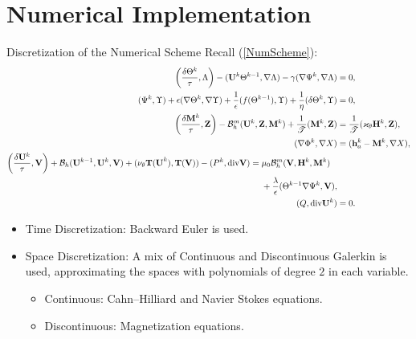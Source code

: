 \documentclass[9pt]{beamer}
\newcommand{\grad}{\nabla}
\newcommand{\diverg}{\textup{div} }
\newcommand{\eps}{\epsilon}
\begin{document}
\section{Numerical Implementation}
\begin{frame}{Discretization of the Numerical Scheme}
	Recall (\ref{NumScheme}):
	\footnotesize\begin{align*}
		\bigg(\frac{\delta\Theta^k}{\tau}, \Lambda\bigg) - (\mathbf{U}^k\Theta^{k-1}, \grad\Lambda) - \gamma(\grad \Psi^k, \grad \Lambda)&=0,\\
		(\Psi^k, \Upsilon) + \eps(\grad \Theta^k, \grad \Upsilon) + \frac{1}{\eps}(f(\Theta^{k-1}), \Upsilon) + \frac{1}{\eta}(\delta\Theta^k, \Upsilon) &= 0,\\
		\bigg(\frac{\delta\mathbf{M}^k}{\tau}, \mathbf{Z}\bigg) - \mathcal{B}_h^m(\mathbf{U}^k, \mathbf{Z}, \mathbf{M}^k) + \frac{1}{\mathscr{T}}(\mathbf{M}^k, \mathbf{Z}) &= \frac{1}{\mathscr{T}}(\varkappa_\theta\mathbf{H}^k, \mathbf{Z}),\\
		(\grad\Phi^k, \grad X) &= (\mathbf{h}_a^k - \mathbf{M}^k, \grad X),\\
		\begin{split}
		\bigg(\frac{\delta\mathbf{U}^k}{\tau}, \mathbf{V}\bigg) + \mathcal{B}_h(\mathbf{U}^{k-1}, \mathbf{U}^k, \mathbf{V}) + (\nu_\theta\mathbf{T(U}^k), \mathbf{T(V)}) - (P^k, \diverg \mathbf{V}) &= \mu_0\mathcal{B}_h^m(\mathbf{V}, \mathbf{H}^k, \mathbf{M}^k)\\
		&\phantom{{}={}}+\frac{\lambda}{\eps}(\Theta^{k-1}\grad \Psi^k, \mathbf{V}),
		\end{split}\\
		(Q, \diverg\mathbf{U}^k) &= 0.
	\end{align*}
	\begin{itemize}
		\item Time Discretization: Backward Euler is used.
		\item Space Discretization: A mix of Continuous and Discontinuous Galerkin is used, approximating the spaces with polynomials of degree $2$ in each variable.
		\begin{itemize}
			\item Continuous: Cahn--Hilliard and Navier Stokes equations.
			\item Discontinuous: Magnetization equations.
		\end{itemize}
	\end{itemize}
\end{frame}
\end{document}
